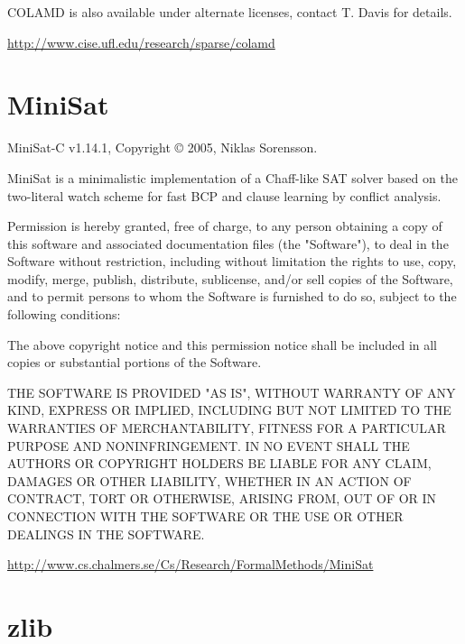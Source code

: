 COLAMD is also available under alternate licenses, contact T. Davis for
details.


\noindent
\url{http://www.cise.ufl.edu/research/sparse/colamd}


\section{MiniSat}

\noindent
MiniSat-C v1.14.1, Copyright {\copyright} 2005, Niklas Sorensson.


MiniSat is a minimalistic implementation of a Chaff-like SAT solver
based on the two-literal watch scheme for fast BCP and clause learning
by conflict analysis.


Permission is hereby granted, free of charge, to any person obtaining a
copy of this software and associated documentation files (the
"Software"), to deal in the Software without restriction, including
without limitation the rights to use, copy, modify, merge, publish,
distribute, sublicense, and/or sell copies of the Software, and to
permit persons to whom the Software is furnished to do so, subject to
the following conditions:

The above copyright notice and this permission notice shall be included
in all copies or substantial portions of the Software.

THE SOFTWARE IS PROVIDED "AS IS", WITHOUT WARRANTY OF ANY KIND, EXPRESS
OR IMPLIED, INCLUDING BUT NOT LIMITED TO THE WARRANTIES OF
MERCHANTABILITY, FITNESS FOR A PARTICULAR PURPOSE AND
NONINFRINGEMENT. IN NO EVENT SHALL THE AUTHORS OR COPYRIGHT HOLDERS BE
LIABLE FOR ANY CLAIM, DAMAGES OR OTHER LIABILITY, WHETHER IN AN ACTION
OF CONTRACT, TORT OR OTHERWISE, ARISING FROM, OUT OF OR IN CONNECTION
WITH THE SOFTWARE OR THE USE OR OTHER DEALINGS IN THE SOFTWARE.


\noindent
\url{http://www.cs.chalmers.se/Cs/Research/FormalMethods/MiniSat}


\section{zlib}

